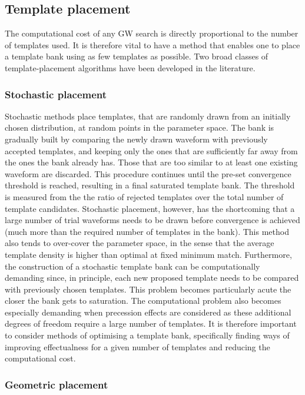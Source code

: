 \documentclass[binding=0.6cm, LaM]{sapthesis}
\begin{document}
\subsection{Template placement}


	The computational cost of any GW search
	 is directly proportional to the number of templates used.
	It is therefore vital to have a method that enables one 
	to place a template bank using as few templates as possible. 
	Two broad classes of template-placement algorithms 
	have been developed in the literature. 

\subsubsection{Stochastic placement}

	Stochastic methods place templates, 
	that are randomly drawn from an initially chosen distribution, 
	at random points in the parameter space.
	The bank is gradually built by comparing the newly drawn waveform
	with previously accepted templates, 
	and keeping only the ones that are sufficiently far away 
	from the ones the bank already has.
 	Those that are too similar to at least one existing waveform are discarded.
	This procedure continues until the pre-set convergence threshold is reached, 
	resulting in a final saturated template bank.
	The threshold is measured from the the ratio of rejected templates over the total number of template candidates.
	Stochastic placement, however, has the shortcoming that 
	a large number of trial waveforms needs to be drawn before convergence is achieved 
	(much more than the required number of templates in the bank). 
	This method also tends to over-cover the parameter space, 
	in the sense that the average template density is higher than optimal at fixed minimum match.
	Furthermore, the construction of a stochastic template bank 
	can be computationally demanding since, in principle, 
	each new proposed template needs to be compared 
	with previously chosen templates. 
	This problem becomes particularly acute 
	the closer the bank gets to saturation. 
	The computational problem also becomes especially demanding 
	when precession effects are considered as these additional degrees 
	of freedom require a large number of templates. 
	It is therefore important to consider methods of optimising a template bank, 
	specifically finding ways of improving effectualness for a given number 
	of templates and reducing the computational cost. 

\subsubsection{Geometric placement}
\end{document}
